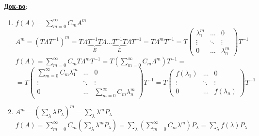 \documentclass[12pt,a4paper]{article}
\newcommand{\bfline}[1]{\textbf{\underline{#1}}}
\begin{document}
\bfline{Док-во}:
\begin{enumerate}
	\item $f(A) = \sum\limits_{m=0}^{\infty} C_m A^m$ \newline
		$A^m = {(T \Lambda T^{-1})}^m = T \Lambda \underset{E}{\underbrace{T^{-1} T}} \Lambda \ldots \underset{E}{\underbrace{T^{-1} T}} \Lambda T^{-1} = T \Lambda^m T^{-1} = T
		\left(
		\begin{matrix}
			\lambda_1^m & \ldots & 0 \\
			\vdots & \ddots & \vdots \\
			0 & \ldots & \lambda_n^m
		\end{matrix}
		\right) T^{-1}$ \newline
		$f(A) = \sum\limits_{m=0}^{\infty} C_m T \Lambda^m T^{-1} = T\left( \sum\limits_{m=0}^{\infty} C_m \Lambda^m \right) T^{-1} = $ \newline
		$=T
		\left(
		\begin{matrix}
			\sum\limits_{m=0}^{\infty} C_m \lambda_1^m & \ldots & 0 \\
			\vdots & \ddots & \vdots \\
			0 & \ldots & \sum\limits_{m=0}^{\infty} C_m \lambda_n^m
		\end{matrix}
		\right) T^{-1} = T
		\left(
		\begin{matrix}
			f(\lambda_1) & \ldots & 0 \\
			\vdots & \ddots & \vdots \\
			0 & \ldots & f(\lambda_n)
		\end{matrix}
		\right) T^{-1}$
	\item $A^m = {\left( \sum\limits_{\lambda} \lambda P_{\lambda} \right)}^m = \sum\limits_{\lambda} \lambda^m P_{\lambda}$ \newline
		$f(A) = \sum\limits_{m=0}^{\infty} C_m \left( \sum\limits_{\lambda} \lambda^m P_{\lambda} \right) = \sum\limits_{\lambda} \left( \sum\limits_{m=0}^{\infty} C_m \lambda^m \right) P_{\lambda} = \sum\limits_{\lambda} f(\lambda) P_{\lambda}$
\end{enumerate}
\end{document}
